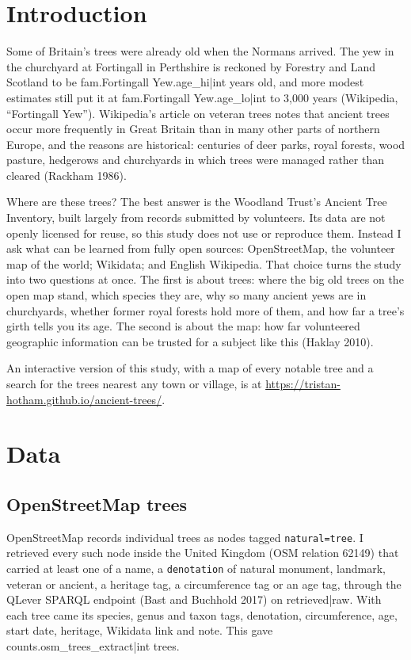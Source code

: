 \documentclass[11pt,a4paper]{article}
\begin{document}
\section{Introduction}

Some of Britain's trees were already old when the Normans arrived. The yew in the churchyard at Fortingall in Perthshire is reckoned by Forestry and Land Scotland to be {{fam.Fortingall Yew.age_hi|int}} years old, and more modest estimates still put it at {{fam.Fortingall Yew.age_lo|int}} to 3,000 years (Wikipedia, ``Fortingall Yew''). Wikipedia's article on veteran trees notes that ancient trees occur more frequently in Great Britain than in many other parts of northern Europe, and the reasons are historical: centuries of deer parks, royal forests, wood pasture, hedgerows and churchyards in which trees were managed rather than cleared (Rackham 1986).

Where are these trees? The best answer is the Woodland Trust's Ancient Tree Inventory, built largely from records submitted by volunteers. Its data are not openly licensed for reuse, so this study does not use or reproduce them. Instead I ask what can be learned from fully open sources: OpenStreetMap, the volunteer map of the world; Wikidata; and English Wikipedia. That choice turns the study into two questions at once. The first is about trees: where the big old trees on the open map stand, which species they are, why so many ancient yews are in churchyards, whether former royal forests hold more of them, and how far a tree's girth tells you its age. The second is about the map: how far volunteered geographic information can be trusted for a subject like this (Haklay 2010).

An interactive version of this study, with a map of every notable tree and a search for the trees nearest any town or village, is at \url{https://tristan-hotham.github.io/ancient-trees/}.

\section{Data}

\subsection{OpenStreetMap trees}

OpenStreetMap records individual trees as nodes tagged \texttt{natural=tree}. I retrieved every such node inside the United Kingdom (OSM relation 62149) that carried at least one of a name, a \texttt{denotation} of natural monument, landmark, veteran or ancient, a heritage tag, a circumference tag or an age tag, through the QLever SPARQL endpoint (Bast and Buchhold 2017) on {{retrieved|raw}}. With each tree came its species, genus and taxon tags, denotation, circumference, age, start date, heritage, Wikidata link and note. This gave {{counts.osm_trees_extract|int}} trees.
\end{document}

